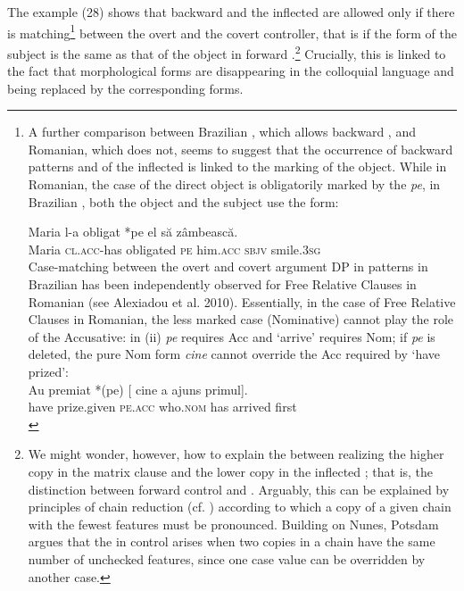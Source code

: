 \documentclass[output=paper]{langsci/langscibook}
\begin{document}
The example (28) shows that backward  and the inflected  are allowed only if there is  matching\footnote{A further comparison between Brazilian , which allows backward , and Romanian, which does not, seems to suggest that the occurrence of backward  patterns and of the inflected  is linked to the  marking of the object. While in Romanian, the case of the direct object is obligatorily marked by the  \textit{pe}, in Brazilian , both the object and the subject use the  form: 

\ea\gll * Maria  l-a     obligat     *pe el            să      zâmbească.\\
        {} Maria  \textsc{cl.acc}{}-has        obligated     \textsc{pe} him\textsc{.acc} \textsc{sbjv} smile\textsc{{}.3sg}\\
\z
Case-matching between the overt and covert argument DP in  patterns in Brazilian  has been independently observed for Free Relative Clauses in Romanian (see Alexiadou et al. 2010). Essentially, in the case of Free Relative Clauses in Romanian, the less marked case (Nominative) cannot play the role of the Accusative: in (ii) \textit{pe} requires Acc and ‘arrive’ requires Nom; if \textit{pe} is deleted, the pure Nom form \textit{cine} cannot override the Acc required by ‘have prized’: 
\ea \citep{Alexiadou2010}\\\gll  Au    premiat       *(pe)     [ cine        a     ajuns    primul].\\
have prize.given   \textsc{pe.acc} {}  who.\textsc{nom} has arrived first\\
\z} between the overt and the covert controller, that is if the  form of the subject is the same as that of the object in forward .\footnote{We might wonder, however, how to explain the  between realizing the higher copy in the matrix clause and the lower copy in the inflected ; that is, the distinction between forward control and . Arguably, this  can be explained by principles of chain reduction (cf. \citealt{Nunes2004}) according to which a copy of a given chain with the fewest features must be pronounced. Building on Nunes, Potsdam argues that the  in control arises when two copies in a chain have the same number of unchecked features, since one case value can be overridden by another case.} Crucially, this is linked to the fact that morphological  forms are disappearing in the colloquial language and being replaced by the corresponding  forms.
\end{document}
